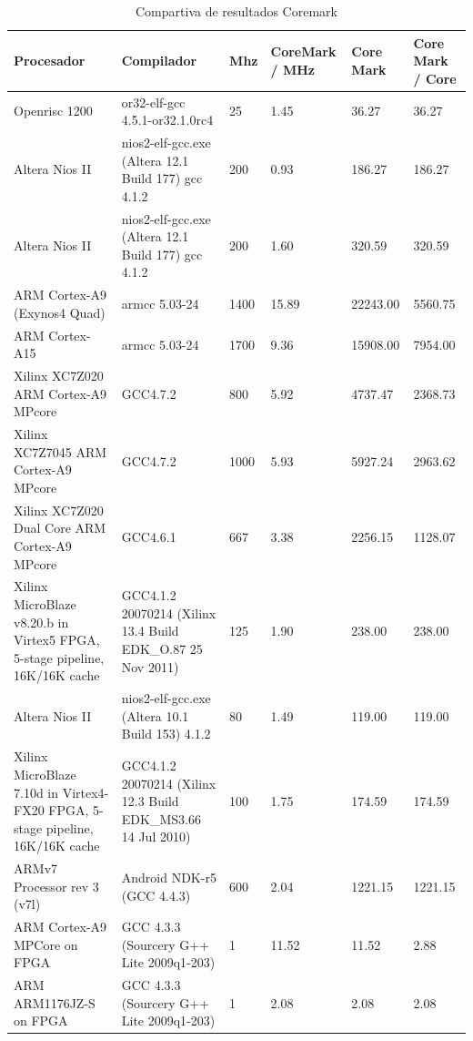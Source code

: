 \begin{table}[h!]
\begin{center}
\begin{tabular}{ |p{4cm} |p{4cm}|p{0.8cm}|p{1.5cm}|p{2.1cm}|p{2.2cm}|}
\hline
\rowcolor[gray]{0.8} Procesador &	Compilador &	 Mhz &	CoreMark / MHz &	Core Mark &	 Core Mark / Core \\
\hline
	Openrisc 1200 & or32-elf-gcc 4.5.1-or32.1.0rc4							&25		&1.45   &36.27		&36.27 \\
\hline
	Altera Nios II & nios2-elf-gcc.exe (Altera 12.1 Build 177) gcc 4.1.2	&200	&0.93 	&186.27 	&186.27\\
\hline
	Altera Nios II & nios2-elf-gcc.exe (Altera 12.1 Build 177) gcc 4.1.2	&200	&1.60 	&320.59 	&320.59\\
\hline
	ARM Cortex-A9  (Exynos4 Quad) &	armcc 5.03-24							&1400	&15.89 	&22243.00 	&5560.75\\
\hline
	ARM Cortex-A15 &	armcc 5.03-24											&1700	&9.36 	&15908.00 	&7954.00\\
\hline
	Xilinx XC7Z020 ARM Cortex-A9 MPcore &	GCC4.7.2							&800	&5.92 	&4737.47 	&2368.73\\
\hline
	Xilinx XC7Z7045 ARM Cortex-A9 MPcore&	GCC4.7.2						&1000	&5.93 	&5927.24 	&2963.62\\
\hline
	Xilinx XC7Z020 Dual Core ARM Cortex-A9 MPcore&	GCC4.6.1				&667	&3.38 	&2256.15 	&1128.07\\
\hline
	Xilinx MicroBlaze v8.20.b in Virtex5 FPGA, 5-stage pipeline, 16K/16K cache &	GCC4.1.2 20070214 (Xilinx 13.4 Build EDK\_O.87 25 Nov 2011)	
																			&125	&1.90   &238.00 	&238.00 \\
\hline
	Altera Nios II &	nios2-elf-gcc.exe (Altera 10.1 Build 153) 4.1.2			&80		&1.49 	&119.00		&119.00\\
\hline
	Xilinx MicroBlaze 7.10d in Virtex4-FX20 FPGA, 5-stage pipeline, 16K/16K cache&	GCC4.1.2 20070214 (Xilinx 12.3 Build EDK\_MS3.66 14 Jul 2010)	
																			&100	&1.75	&174.59 	&174.59\\
\hline
	ARMv7 Processor rev 3 (v7l) &	Android NDK-r5 (GCC 4.4.3)					&600	&2.04 	&1221.15	&1221.15\\ 
\hline
	ARM Cortex-A9 MPCore on FPGA &	GCC 4.3.3 (Sourcery G++ Lite 2009q1-203)		&1		&11.52 	&11.52 		&2.88 	 	\\
\hline
	ARM ARM1176JZ-S	on FPGA & GCC 4.3.3 (Sourcery G++ Lite 2009q1-203)				&1		&2.08 	&2.08 		&2.08		\\
\hline
\end{tabular}
\end{center}
\caption{Compartiva de resultados Coremark}
\label{tab:compcoremark}
\end{table}


